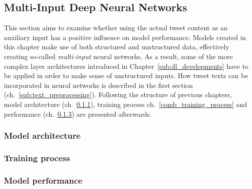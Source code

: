 \subsection{Multi-Input Deep Neural Networks}
\label{sec:deep_combined}

This section aims to examine whether using the actual tweet content as an
auxiliary input has a positive influence on model performance.
Models created in this chapter make use of both structured and unstructured data,
effectively creating so-called \textit{multi-input} neural networks.
As a result, some of the more complex layer architectures introduced in Chapter~\ref{sub:dl_developments}
have to be applied in order to make sense of unstructured inputs.
How tweet texts can be incorporated in neural networks is described in the
first section (ch.~\ref{sub:text_preprocessing}).
Following the structure of previous chapters, model architecture (ch.~\ref{sub:comb_model_architecture}),
training process {ch.~\ref{comb_training_process}} and performance (ch.~\ref{sub:comb_performance})
are presented afterwards.



\subsubsection{Model architecture}
\label{sub:comb_model_architecture}

\subsubsection{Training process}
\label{sub:comb_training_process}

\subsubsection{Model performance}
\label{sub:comb_performance}


